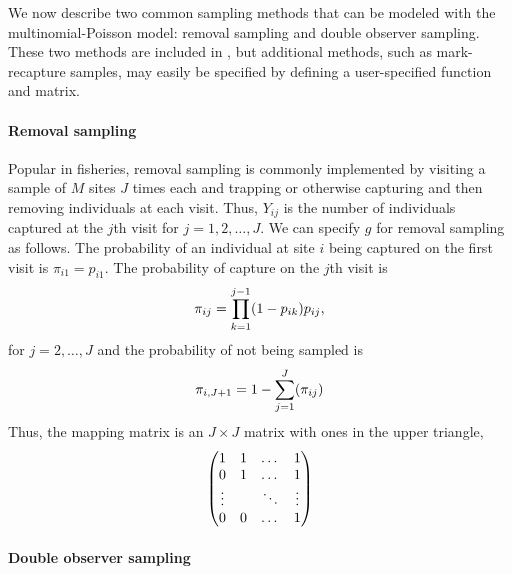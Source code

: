 \documentclass[article,shortnames]{jss}
\newcommand{\um}{\pkg{unmarked}}
\begin{document}
We now describe two common sampling methods that can be modeled
with the multinomial-Poisson model: removal sampling and double
observer sampling.  These two methods are included in \um, but
additional methods, such as mark-recapture samples, may easily be specified 
by defining a user-specified  function and  matrix.

\paragraph{Removal sampling }

Popular in fisheries, removal sampling is commonly implemented by 
visiting a sample of $M$ sites $J$ times each and trapping or 
otherwise capturing and then removing individuals at each visit.  Thus, 
$Y_{ij}$ is the number of individuals captured at the $j$th visit for 
$j=1,2,\dots,J$. We can specify $g$ for removal sampling as follows.  The
probability of an individual at site $i$ being captured on the first
visit is $\pi_{i1} = p_{i1}$.  The probability of capture on the $j$th
visit is
\begin{equation}
  \pi_{ij} = \prod_{k=1}^{j-1}(1 - p_{ik})p_{ij}, \notag
\end{equation}
for $j=2,\dots,J$ and the probability of not being sampled is
\begin{equation}
  \pi_{i,J+1} = 1 - \sum_{j=1}^{J}(\pi_{ij}) \notag
\end{equation}
Thus, the mapping matrix is an $J \times J$  matrix with ones in
the upper triangle,
\begin{equation}
  \begin{pmatrix}
    1 & 1 & \dots & 1 \\
    0 & 1 & \dots & 1 \\
    \vdots & & \ddots & \vdots \\
    0 & 0 & \dots  & 1 \notag
  \end{pmatrix}
\end{equation}


\paragraph{Double observer sampling}
\label{sec:double-observ-sampl}
\end{document}
